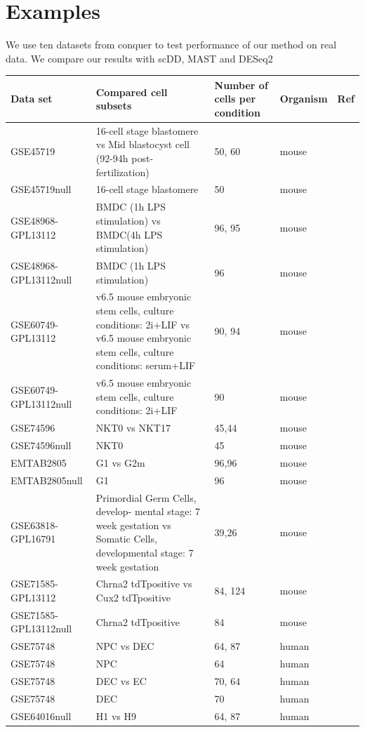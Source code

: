 \documentclass[11pt]{amsart}
\begin{document}
 \section{Examples}
We use ten datasets from conquer\cite{ref:Cq} to test performance of our method on real data. We compare our results with scDD\cite{ref:scDD}, MAST\cite{ref:MAST} and DESeq2\cite{ref:Des}\\
\begin{tabular}{ |p{3cm}|p{3cm}|p{3cm}|p{3cm}|p{3cm}|}
\hline
 Data set & Compared cell subsets & Number of cells per condition & Organism & Ref\\
 \hline
 \hline
 GSE45719 & 16-cell stage blastomere vs Mid blastocyst cell (92-94h post- fertilization) & 50, 60 & mouse & \cite{Deng193}\\
 \hline
 GSE45719null &  16-cell stage blastomere & 50 & mouse &  \cite{Deng193}\\
 \hline
 GSE48968-GPL13112 & BMDC (1h LPS stimulation) vs BMDC(4h LPS stimulation) & 96, 95 & mouse & \cite{Shalek}\\
 \hline
 GSE48968-GPL13112null & BMDC (1h LPS stimulation) & 96 & mouse & \cite{Shalek}\\
 \hline
 GSE60749-GPL13112 & v6.5 mouse embryonic stem cells, culture conditions: 2i+LIF vs v6.5 mouse embryonic stem cells, culture conditions: serum+LIF & 90, 94 & mouse & \cite{Kumar}\\
 \hline
 GSE60749-GPL13112null & v6.5 mouse embryonic stem cells, culture conditions: 2i+LIF & 90 & mouse & \cite{Kumar}\\
 \hline
 GSE74596 & NKT0 vs NKT17 & 45,44 & mouse & \cite{Engel}\\
 \hline
 GSE74596null & NKT0 & 45 & mouse & \cite{Engel}\\
 \hline
 
 EMTAB2805 & G1 vs G2m & 96,96 & mouse & \cite{EMTAB}\\
 \hline
 EMTAB2805null & G1 & 96 & mouse & \cite{EMTAB}\\
 \hline
 GSE63818-GPL16791 & Primordial Germ Cells, develop- mental stage: 7 week gestation vs Somatic Cells, developmental stage: 7 week gestation & 39,26 & mouse & \cite{Guo}\\
 \hline
 GSE71585-GPL13112 & Chrna2 tdTpositive vs Cux2 tdTpositive & 84, 124 & mouse & \cite{Tasic}\\
 \hline
GSE71585-GPL13112null & Chrna2 tdTpositive & 84 & mouse & \cite{Tasic}\\
\hline
GSE75748 & NPC vs DEC & 64, 87 & human & \cite{chu}\\
\hline
GSE75748 & NPC & 64 & human & \cite{chu}\\
\hline
GSE75748 & DEC vs EC & 70, 64 & human & \cite{chu}\\
\hline
GSE75748 & DEC & 70 & human & \cite{chu}\\
\hline
GSE64016null & H1 vs H9 & 64, 87 & human & \cite{oscope}\\
\hline
\end{tabular}\\
\end{document}
